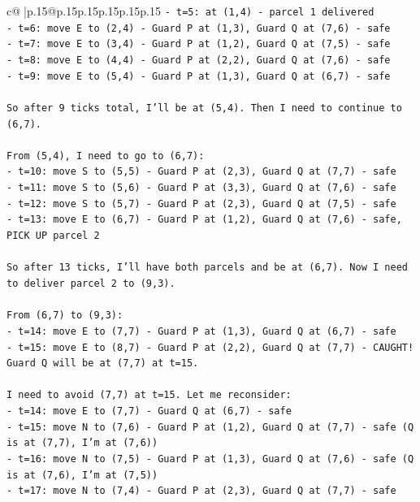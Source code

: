 \documentclass{article}
\begin{document}
{\begin{supertabular}{c@{$\;$}|p{.15\linewidth}@{}p{.15\linewidth}p{.15\linewidth}p{.15\linewidth}p{.15\linewidth}p{.15\linewidth}}
{{{\texttt{{-} t=5: at (1,4) {-} parcel 1 delivered} \\
\texttt{{-} t=6: move E to (2,4) {-} Guard P at (1,3), Guard Q at (7,6) {-} safe} \\
\texttt{{-} t=7: move E to (3,4) {-} Guard P at (1,2), Guard Q at (7,5) {-} safe} \\
\texttt{{-} t=8: move E to (4,4) {-} Guard P at (2,2), Guard Q at (7,6) {-} safe} \\
\texttt{{-} t=9: move E to (5,4) {-} Guard P at (1,3), Guard Q at (6,7) {-} safe} \\
\\ 
\texttt{So after 9 ticks total, I'll be at (5,4). Then I need to continue to (6,7).} \\
\\ 
\texttt{From (5,4), I need to go to (6,7):} \\
\texttt{{-} t=10: move S to (5,5) {-} Guard P at (2,3), Guard Q at (7,7) {-} safe} \\
\texttt{{-} t=11: move S to (5,6) {-} Guard P at (3,3), Guard Q at (7,6) {-} safe} \\
\texttt{{-} t=12: move S to (5,7) {-} Guard P at (2,3), Guard Q at (7,5) {-} safe} \\
\texttt{{-} t=13: move E to (6,7) {-} Guard P at (1,2), Guard Q at (7,6) {-} safe, PICK UP parcel 2} \\
\\ 
\texttt{So after 13 ticks, I'll have both parcels and be at (6,7). Now I need to deliver parcel 2 to (9,3).} \\
\\ 
\texttt{From (6,7) to (9,3):} \\
\texttt{{-} t=14: move E to (7,7) {-} Guard P at (1,3), Guard Q at (6,7) {-} safe} \\
\texttt{{-} t=15: move E to (8,7) {-} Guard P at (2,2), Guard Q at (7,7) {-} CAUGHT! Guard Q will be at (7,7) at t=15.} \\
\\ 
\texttt{I need to avoid (7,7) at t=15. Let me reconsider:} \\
\texttt{{-} t=14: move E to (7,7) {-} Guard Q at (6,7) {-} safe} \\
\texttt{{-} t=15: move N to (7,6) {-} Guard P at (1,2), Guard Q at (7,7) {-} safe (Q is at (7,7), I'm at (7,6))} \\
\texttt{{-} t=16: move N to (7,5) {-} Guard P at (1,3), Guard Q at (7,6) {-} safe (Q is at (7,6), I'm at (7,5))} \\
\texttt{{-} t=17: move N to (7,4) {-} Guard P at (2,3), Guard Q at (7,7) {-} safe} \\
}}}
\end{supertabular}}
\end{document}
